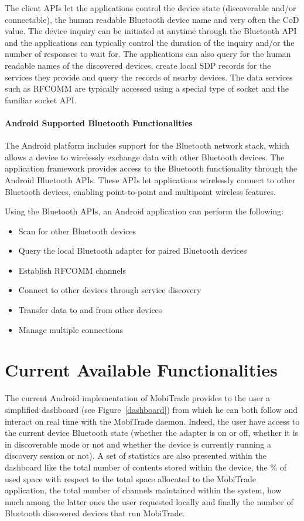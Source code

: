 The client APIs let the applications control the device state (discoverable and/or connectable), the human readable Bluetooth device name and very often the CoD
value. The device inquiry can be initiated at anytime through the Bluetooth API and the applications can typically control the duration of the inquiry and/or the number of
responses to wait for. The applications can also query for the human readable names of the discovered devices, create local SDP records for the services they provide and
query the records of nearby devices. The data services such as RFCOMM are typically accessed using a special type of socket and the familiar socket API.


\paragraph*{Android Supported Bluetooth Functionalities}

The Android platform includes support for the Bluetooth network stack, which allows a device to wirelessly exchange data with other Bluetooth devices. The application framework provides access to the Bluetooth functionality through the Android Bluetooth APIs. These APIs let applications wirelessly connect to other Bluetooth devices, enabling point-to-point and multipoint wireless features.

Using the Bluetooth APIs, an Android application can perform the following:

\begin{itemize}
\item Scan for other Bluetooth devices
\item Query the local Bluetooth adapter for paired Bluetooth devices
\item Establish RFCOMM channels
\item Connect to other devices through service discovery
\item Transfer data to and from other devices
\item Manage multiple connections
\end{itemize}

\section{Current Available Functionalities}
\label{MobiTradeCurrentFunctionalities}

The current Android implementation of MobiTrade provides to the user a simplified dashboard (see Figure~\ref{dashboard}) from which he can both follow and interact on real time with the MobiTrade daemon. Indeed, the user have access to the current device Bluetooth state (whether the adapter is on or off, whether it is in discoverable mode or not and whether the device is currently running a discovery session or not). A set of statistics are also presented within the dashboard like the total number of contents stored within the device, the \% of used space with respect to the total space allocated to the MobiTrade application, the total number of channels maintained within the system, how much among the latter ones the user requested locally and finally the number of Bluetooth discovered devices that run MobiTrade.
 
